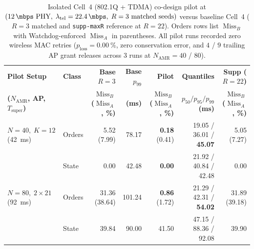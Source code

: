\documentclass[11pt,a4paper]{article}
\newcommand{\Namr}{\ensuremath{N_{\mathrm{AMR}}}}
\newcommand{\ltel}{\ensuremath{\lambda_{\mathrm{tel}}}}
\newcommand{\Tsuper}{\ensuremath{T_{\mathrm{super}}}}
\newcommand{\MissA}{\ensuremath{\operatorname{Miss}_A}}
\newcommand{\MissB}{\ensuremath{\operatorname{Miss}_B}}
\newcommand{\ploss}{\ensuremath{p_{\mathrm{loss}}}}
\begin{document}
\begin{table}[!tbp]
\centering
\scriptsize
\setlength{\tabcolsep}{2.0pt}
\caption{Isolated Cell~4 (802.1Q + TDMA) co-design pilot at $(\qty{12}{\mbps}\text{ PHY},\; \ltel=\qty{22.4}{\mbps},\; R=3\text{ matched seeds})$ versus baseline Cell~4 ($R=3$ matched and \texttt{supp-maxR} reference at $R=22$). Orders rows list $\MissB$ with Watchdog-enforced $\MissA$ in parentheses. All pilot runs recorded zero wireless MAC retries ($\ploss = \qty{0.00}{\percent}$, zero conservation error, and $4$ / $9$ trailing AP grant releases across $3$ runs at $\Namr=40$ / $80$).}
\label{tab:codesign_pilot}
\begin{tabular}{@{}l l r r r r r@{}}
\toprule
\textbf{Pilot Setup} & \textbf{Class} & \textbf{Base $R{=}3$} & \textbf{Base $p_{99}$} & \textbf{Pilot} & \textbf{Quantiles} & \textbf{Supp ($R{=}22$)} \\
\textbf{($\Namr$, AP, $\Tsuper$)} & & \textbf{$\MissB$ ($\MissA$, \%)} & \textbf{(ms)} & \textbf{$\MissB$ ($\MissA$, \%)} & \textbf{$p_{50}/p_{95}/p_{99}$ (ms)} & \textbf{$\MissB$ ($\MissA$, \%)} \\
\midrule
$N{=}40,\; K{=}12$ (\qty{42}{\milli\second}) & Orders & 5.52 (7.99) & 78.17 & \textbf{0.18} (0.41) & 19.05 / 36.01 / \textbf{45.07} & 5.05 (7.27) \\
 & State & 0.00 & 42.48 & \textbf{0.00} & 21.92 / 40.84 / 42.48 & 0.00 \\
\midrule
$N{=}80,\; 2{\times}21$ (\qty{92}{\milli\second}) & Orders & 31.36 (38.64) & 101.24 & \textbf{0.86} (1.72) & 21.29 / 42.31 / \textbf{54.02} & 31.89 (39.18) \\
 & State & 39.84 & 90.00 & 41.50 & 47.15 / 88.36 / 92.08 & 39.90 \\
\bottomrule
\end{tabular}
\end{table}
\end{document}
